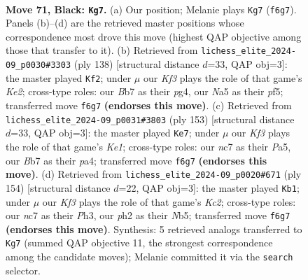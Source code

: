 \documentclass[11pt]{article}
\begin{document}
\clearpage

\begin{figure}[p]\centering
\begin{subfigure}{0.46\textwidth}\centering
\resizebox{\linewidth}{!}{%
\newchessgame
\chessboard[
  setfen={8/PbN5/5k2/n7/1p3P2/6PB/5K1P/3R4 b - - 11 71},
  showmover=false,
  pgfstyle=straightmove, color=movearrow, markmove={f6-g7}
]}
\caption{}
\end{subfigure}\hfill
\begin{subfigure}{0.46\textwidth}\centering
\resizebox{\linewidth}{!}{%
\newchessgame
\chessboard[
  setfen={7b/5k1P/4p3/1p1p1p2/6p1/8/4K3/8 w - - 5 70},
  showmover=false,
  pgfstyle=straightmove, color=movearrow, markmove={e2-f2}
]}
\caption{}
\end{subfigure}
\\[4pt]
\begin{subfigure}{0.46\textwidth}\centering
\resizebox{\linewidth}{!}{%
\newchessgame
\chessboard[
  setfen={4k3/2b5/4p3/p6p/P7/4P3/1N3PK1/8 b - - 6 77},
  showmover=false,
  pgfstyle=straightmove, color=movearrow, markmove={e8-e7}
]}
\caption{}
\end{subfigure}\hfill
\begin{subfigure}{0.46\textwidth}\centering
\resizebox{\linewidth}{!}{%
\newchessgame
\chessboard[
  setfen={8/5p2/6p1/1N1kp1Bp/8/7P/2K3P1/b7 w - - 20 78},
  showmover=false,
  pgfstyle=straightmove, color=movearrow, markmove={c2-b1}
]}
\caption{}
\end{subfigure}
\caption{\textbf{Move 71, Black: \texttt{Kg7}.} (a) Our position; Melanie plays \texttt{Kg7} (\texttt{f6g7}). Panels (b)--(d) are the retrieved master positions whose correspondence most drove this move (highest QAP objective among those that transfer to it). (b) Retrieved from \texttt{lichess\_elite\_2024-09\_p0030\#3303} (ply 138) [structural distance $d$=33, QAP obj=3]: the master played \texttt{Kf2}; under $\mu$ our \emph{Kf3} plays the role of that game's \emph{Ke2}; cross-type roles: our \emph{B}b7 as their \emph{p}g4, our \emph{N}a5 as their \emph{p}f5; transferred move \texttt{f6g7} \textbf{(endorses this move)}. (c) Retrieved from \texttt{lichess\_elite\_2024-09\_p0031\#3803} (ply 153) [structural distance $d$=33, QAP obj=3]: the master played \texttt{Ke7}; under $\mu$ our \emph{Kf3} plays the role of that game's \emph{Ke1}; cross-type roles: our \emph{n}c7 as their \emph{P}a5, our \emph{B}b7 as their \emph{p}a4; transferred move \texttt{f6g7} \textbf{(endorses this move)}. (d) Retrieved from \texttt{lichess\_elite\_2024-09\_p0020\#671} (ply 154) [structural distance $d$=22, QAP obj=3]: the master played \texttt{Kb1}; under $\mu$ our \emph{Kf3} plays the role of that game's \emph{Kc2}; cross-type roles: our \emph{n}c7 as their \emph{P}h3, our \emph{p}h2 as their \emph{N}b5; transferred move \texttt{f6g7} \textbf{(endorses this move)}. Synthesis: 5 retrieved analogs transferred to \texttt{Kg7} (summed QAP objective 11, the strongest correspondence among the candidate moves); Melanie committed it via the \texttt{search} selector.}
\label{fig:thought-m141}
\end{figure}
\end{document}
